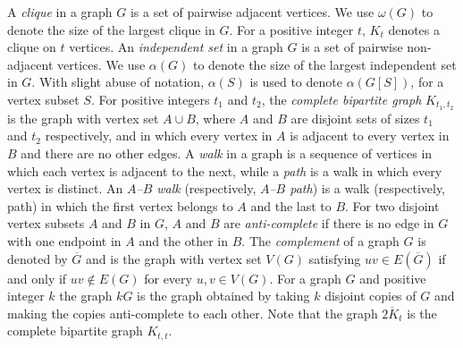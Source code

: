 \documentclass[11pt]{amsart}
\begin{document}
A {\em clique} in a graph $G$ is a set of pairwise adjacent vertices. 
%
We use $\omega(G)$ to denote the size of the largest clique in $G$.
%
For a positive integer $t$, $K_t$ denotes a clique on $t$ vertices.
%
An \emph{independent set} in a graph $G$ is a set of pairwise non-adjacent vertices.
%
We use $\alpha(G)$ to denote the size of the largest independent set in $G$.
%
With slight abuse of notation, $\alpha(S)$ is used to denote $\alpha(G[S])$, for a vertex subset $S$.
% 
For positive integers $t_1$ and $t_2$, the {\em complete bipartite graph} $K_{t_1, t_2}$ is
the graph with vertex set $A \cup B$, where $A$ and $B$ are disjoint sets of sizes
$t_1$ and $t_2$ respectively, and in which every vertex in $A$ is adjacent to every
vertex in $B$ and there are no other edges.
%
A \emph{walk} in a graph is a sequence of vertices in which each vertex is adjacent to the next, while a \emph{path} is a walk in which every vertex is distinct. An \emph{$A$--$B$ walk} (respectively, \emph{$A$--$B$ path}) is a walk (respectively, path) in which the first vertex belongs to $A$ and the last to $B$.
%
For two disjoint vertex subsets $A$ and $B$ in $G$, $A$ and $B$ are {\em anti-complete} if there is no edge in $G$ with one endpoint in $A$ and the other in $B$.
%
The {\em complement} of a graph $G$ is denoted by $\overline{G}$ and is the graph with vertex set $V(G)$ satisfying $uv\in E(\overline{G})$ if and only if $uv\notin E(G)$ for every $u,v\in V(G)$.
%
For a graph $G$ and positive integer $k$ the graph $kG$ is the graph obtained by taking $k$ disjoint copies of $G$ and making the copies anti-complete to each other. Note that the graph $\overline{2K_t}$ is the complete bipartite graph $K_{t,t}$. 
\end{document}
